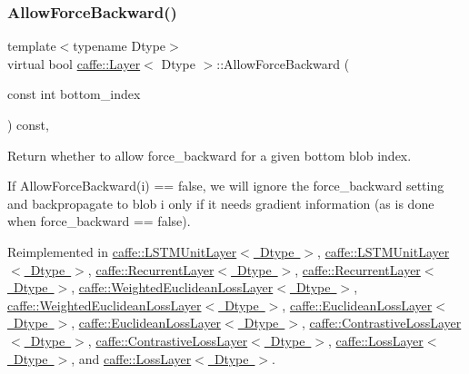 \mbox{\label{classcaffe_1_1_layer_a1c0b2bffcd6d57e4bd49f820941badb6}} 
\subsubsection{\texorpdfstring{Allow\+Force\+Backward()}{AllowForceBackward()}\hspace{0.1cm}{\footnotesize\ttfamily [2/2]}}
{\footnotesize\ttfamily template$<$typename Dtype$>$ \\
virtual bool \mbox{\hyperlink{classcaffe_1_1_layer}{caffe\+::\+Layer}}$<$ Dtype $>$\+::Allow\+Force\+Backward (\begin{DoxyParamCaption}\item[{const int}]{bottom\+\_\+index }\end{DoxyParamCaption}) const\hspace{0.3cm}{\ttfamily [inline]}, {\ttfamily [virtual]}}



Return whether to allow force\+\_\+backward for a given bottom blob index. 

If Allow\+Force\+Backward(i) == false, we will ignore the force\+\_\+backward setting and backpropagate to blob i only if it needs gradient information (as is done when force\+\_\+backward == false). 

Reimplemented in \mbox{\hyperlink{classcaffe_1_1_l_s_t_m_unit_layer_a9c46167bc8b96b28196bc24a5515b531}{caffe\+::\+L\+S\+T\+M\+Unit\+Layer$<$ Dtype $>$}}, \mbox{\hyperlink{classcaffe_1_1_l_s_t_m_unit_layer_a9c46167bc8b96b28196bc24a5515b531}{caffe\+::\+L\+S\+T\+M\+Unit\+Layer$<$ Dtype $>$}}, \mbox{\hyperlink{classcaffe_1_1_recurrent_layer_a8d91610cc8b9615a1db4f07fe5590a37}{caffe\+::\+Recurrent\+Layer$<$ Dtype $>$}}, \mbox{\hyperlink{classcaffe_1_1_recurrent_layer_a8d91610cc8b9615a1db4f07fe5590a37}{caffe\+::\+Recurrent\+Layer$<$ Dtype $>$}}, \mbox{\hyperlink{classcaffe_1_1_weighted_euclidean_loss_layer_a6b996834a2a27bb8d2d9b48873b6cd65}{caffe\+::\+Weighted\+Euclidean\+Loss\+Layer$<$ Dtype $>$}}, \mbox{\hyperlink{classcaffe_1_1_weighted_euclidean_loss_layer_a6b996834a2a27bb8d2d9b48873b6cd65}{caffe\+::\+Weighted\+Euclidean\+Loss\+Layer$<$ Dtype $>$}}, \mbox{\hyperlink{classcaffe_1_1_euclidean_loss_layer_a76dd3fde9f09cb9840f05ee035b5a2c5}{caffe\+::\+Euclidean\+Loss\+Layer$<$ Dtype $>$}}, \mbox{\hyperlink{classcaffe_1_1_euclidean_loss_layer_a76dd3fde9f09cb9840f05ee035b5a2c5}{caffe\+::\+Euclidean\+Loss\+Layer$<$ Dtype $>$}}, \mbox{\hyperlink{classcaffe_1_1_contrastive_loss_layer_af0f16d5119ac6118b670c1966c38fd7d}{caffe\+::\+Contrastive\+Loss\+Layer$<$ Dtype $>$}}, \mbox{\hyperlink{classcaffe_1_1_contrastive_loss_layer_af0f16d5119ac6118b670c1966c38fd7d}{caffe\+::\+Contrastive\+Loss\+Layer$<$ Dtype $>$}}, \mbox{\hyperlink{classcaffe_1_1_loss_layer_a36d35155bfe0de53a79c517f33759612}{caffe\+::\+Loss\+Layer$<$ Dtype $>$}}, and \mbox{\hyperlink{classcaffe_1_1_loss_layer_a36d35155bfe0de53a79c517f33759612}{caffe\+::\+Loss\+Layer$<$ Dtype $>$}}.


